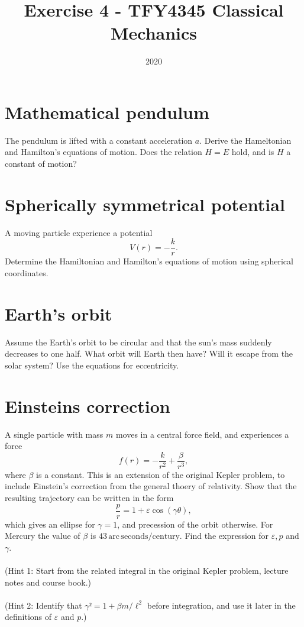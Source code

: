 \documentclass{article}
\title{Exercise 4 - TFY4345 Classical Mechanics}
\date{2020}
\begin{document}
    \maketitle
    \section{Mathematical pendulum}
    The pendulum is lifted with a constant acceleration $a$. Derive the Hameltonian and Hamilton's equations of motion. Does the relation $H = E$ hold, and is $H$ a constant of motion?

    \section{Spherically symmetrical potential}
    A moving particle experience a potential 
    \begin{equation*}
        V(r) = -\frac{k}{r}.
    \end{equation*}
    Determine the Hamiltonian and Hamilton's equations of motion using spherical coordinates.

    \section{Earth's orbit}
    Assume the Earth's orbit to be circular and that the sun's mass suddenly decreases to one half. What orbit will Earth then have? Will it escape from the solar system? Use the equations for eccentricity.

    \section{Einsteins correction}
    A single particle with mass $m$ moves in a central force field, and experiences a force 
    \begin{equation*}
        f(r) = -\frac{k}{r^2} + \frac{\beta}{r^3},
    \end{equation*}
    where $\beta$ is a constant. This is an extension of the original Kepler problem, to include Einstein's correction from the general thoery of relativity. Show that the resulting trajectory can be written in the form 
    \begin{equation*}
        \frac{p}{r} = 1 + \varepsilon \cos(\gamma \theta),
    \end{equation*}
    which gives an ellipse for $\gamma = 1$, and precession of the orbit otherwise. For Mercury the value of $\beta$ is $43 \, \mathrm{arc}\, \mathrm{seconds}/\mathrm{century}$. Find the expression for $\varepsilon, p$ and $\gamma$. \\ \\
    (Hint 1: Start from the related integral in the original Kepler problem, lecture notes and course book.) \\ \\
    (Hint 2: Identify that $\gamma² = 1 + \beta m / \ell^2$ before integration, and use it later in the definitions of $\varepsilon$ and $p$.)
\end{document}

